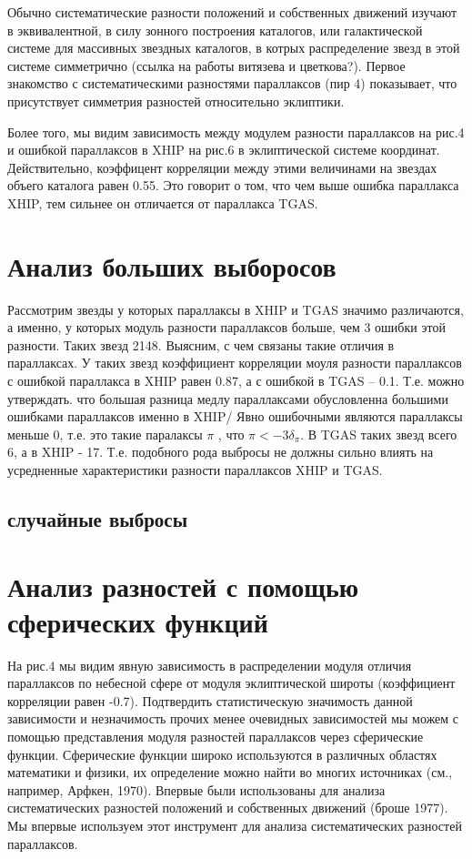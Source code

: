 \documentclass[14pt]{article} %
\begin{document}
Обычно систематические разности положений и собственных движений изучают в эквивалентной, в силу зонного построения каталогов, или галактической системе для массивных звездных каталогов, в котрых распределение звезд в этой системе симметрично (ссылка на работы витязева и цветкова?). Первое знакомство с систематическими разностями параллаксов (пир 4) показывает, что присутствует симметрия разностей относительно эклиптики.

Более того, мы видим зависимость между модулем разности параллаксов на рис.4 и ошибкой параллаксов в XHIP на рис.6  в эклиптической системе координат. Действительно, коэффицент корреляции между этими величинами на звездах объего каталога равен 0.55. Это говорит о том, что чем выше ошибка параллакса XHIP, тем сильнее он отличается от параллакса TGAS.

\section{Анализ больших выборосов}\label{errvid}
Рассмотрим звезды у которых параллаксы в XHIP и TGAS  значимо различаются, а именно, у которых модуль разности параллаксов больше, чем 3 ошибки этой разности. Таких звезд 2148. Выясним, с чем связаны такие отличия в параллаксах. У таких звезд коэффициент корреляции моуля разности параллаксов с ошибкой параллакса в XHIP равен 0.87, а с ошибкой в TGAS -- 0.1. Т.е. можно утверждать. что большая разница медлу параллаксами обусловленна большими ошибками параллаксов именно в XHIP/ Явно ошибочными являются параллаксы меньше 0, т.е. это такие паралаксы $\pi$ , что $\pi < -3\delta_{\pi}$. В TGAS таких звезд всего 6, а в XHIP - 17. Т.е. подобного рода выбросы не должны сильно влиять на усредненные характеристики разности параллаксов XHIP и TGAS.





\subsection{случайные выбросы}\label{sub:smthrs}



\section{Анализ разностей с помощью сферических функций}\label{sistem}
 На рис.4 мы видим явную зависимость в распределении модуля отличия параллаксов по небесной сфере от модуля эклиптической широты (коэффициент корреляции равен -0.7).  Подтвердить статистическую значимость данной зависимости и незначимость прочих менее очевидных зависимостей мы можем с помощью представления модуля разностей параллаксов через сферические функции. Сферические функции широко используются в различных областях математики и физики, их определение можно найти во многих источниках (см., например, Арфкен, 1970). Впервые  были использованы для анализа систематических разностей положений и собственных движений (броше 1977). Мы впервые используем этот инструмент для анализа систематических разностей параллаксов.
 
\end{document}
